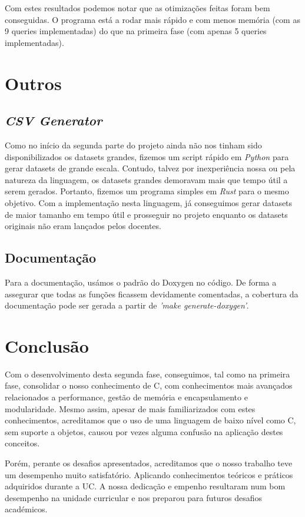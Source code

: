 \documentclass{article}
\begin{document}
            \bigskip
            Com estes resultados podemos notar que as otimizações feitas foram bem conseguidas. O programa está a rodar mais rápido e com menos memória (com as 9 queries implementadas) do que na primeira fase (com apenas 5 queries implementadas).
        \pagebreak
        \section{Outros}
            \subsection{\emph{CSV Generator}}            
                Como no início da segunda parte do projeto ainda não nos tinham sido disponibilizados os datasets grandes,
                fizemos um script rápido em \textit{Python} para gerar datasets de grande escala. Contudo, talvez
                por inexperiência nossa ou pela natureza da linguagem, os datasets grandes demoravam mais que tempo útil 
                a serem gerados. Portanto, fizemos um programa simples em \textit{Rust} para o mesmo objetivo.
                Com a implementação nesta linguagem, já conseguimos gerar datasets de maior tamanho 
                em tempo útil e prosseguir no projeto enquanto os datasets originais não eram lançados pelos docentes.
            \subsection{Documentação}
                Para a documentação, usámos o padrão do Doxygen no código.
                De forma a assegurar que todas as funções ficassem devidamente comentadas,
                a cobertura da documentação pode ser gerada a partir de \textit{'make generate-doxygen'}.
        
        \section{Conclusão}
        Com o desenvolvimento desta segunda fase, conseguimos, tal como na primeira fase, consolidar
        o nosso conhecimento de C, com conhecimentos mais avançados relacionados a performance, gestão
        de memória e encapsulamento e modularidade. Mesmo assim, apesar de mais familiarizados com estes
        conhecimentos, acreditamos que o uso de uma linguagem de baixo nível como C, sem suporte a objetos,
        causou por vezes alguma confusão na aplicação destes conceitos.

        Porém, perante os desafios apresentados, acreditamos que o nosso trabalho teve um desempenho muito
        satisfatório. Aplicando conhecimentos teóricos e práticos adquiridos durante a UC. A nossa dedicação e empenho
        resultaram num bom desempenho na unidade curricular e nos preparou para futuros desafios académicos.
        
\end{document}
